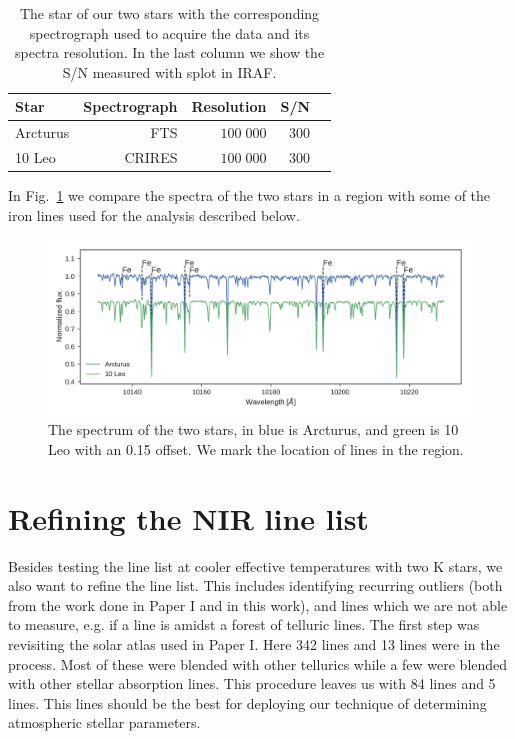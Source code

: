 \documentclass{aa}
\begin{document}
\begin{table}[htb!]
    \caption{The star of our two stars with
             the corresponding spectrograph used to acquire the data and its
             spectra resolution. In the last column we show the S/N measured
             with splot in IRAF.}
    \label{tab:data}
    \centering
    \begin{tabular}{lrrrr}
      \hline\hline
        Star      &  Spectrograph  & Resolution   &  S/N  \\
      \hline
        Arcturus  &  FTS           &  $100\;000$  &  300  \\
        10 Leo    &  CRIRES        &  $100\;000$  &  300
    \end{tabular}
\end{table}


In Fig.~\ref{fig:both} we compare the spectra of the two stars in a region with
some of the iron lines used for the analysis described below.

\begin{figure}[htpb!]
    \centering
    \includegraphics[width=1.0\linewidth]{figures/bothspectra.pdf}
    \caption{The spectrum of the two stars, in blue is Arcturus, and green is
             10 Leo with an 0.15 offset. We mark the location of 
             lines in the region.}
    \label{fig:both}
\end{figure}





\section{Refining the NIR line list}
\label{sec:refining_the_line_list}

Besides testing the line list at cooler effective temperatures with two K stars,
we also want to refine the line list. This includes identifying recurring
outliers (both from the work done in Paper I and in this work), and lines which
we are not able to measure, e.g. if a line is amidst a forest of telluric lines.
The first step was revisiting the solar atlas used in Paper I. Here 342
 lines and 13  lines were in the process. Most of these
were blended with other tellurics while a few were blended with other stellar
absorption lines. This procedure leaves us with 84  lines and 5
 lines. This lines should be the best for deploying our technique of
determining atmospheric stellar parameters.
\end{document}
